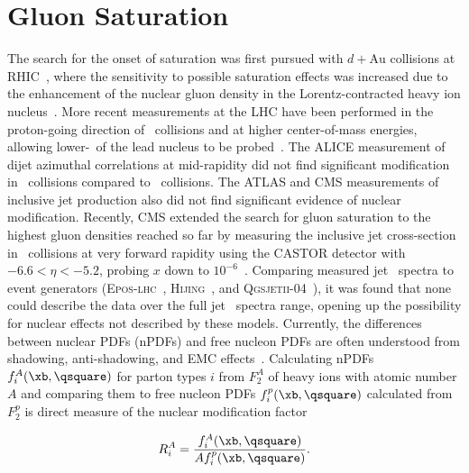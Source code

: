 \FloatBarrier

\section{Gluon Saturation}
The search for the onset of saturation was first pursued with $d+\mathrm{Au}$ collisions at RHIC~\cite{Adler:2003au, Wang:2007zv, Adare:2011sc}, where the sensitivity to possible saturation effects was increased due to the enhancement of the nuclear gluon density in the Lorentz-contracted heavy ion nucleus~\cite{Albacete:2014fwa,Blaizot:2016qgz}. More recent measurements at the LHC have been performed in the proton-going direction of \pPb\ collisions and at higher center-of-mass energies, allowing lower-\xb\ of the lead nucleus to be probed~\cite{ATLAS:2014cpa, Adam:2015xea, Adam:2015hoa, Khachatryan:2016xdg}. The ALICE measurement of dijet azimuthal correlations at mid-rapidity did not find significant modification in \pPb\ collisions compared to \pp\ collisions. The ATLAS and CMS measurements of inclusive jet production also did not find significant evidence of nuclear modification. Recently, CMS extended the search for gluon saturation to the highest gluon densities reached so far by measuring the inclusive jet cross-section in \pPb\ collisions at very forward rapidity using the CASTOR detector with $-6.6 < \eta < -5.2$, probing $x$ down to $10^{-6}$~\cite{VanDeKlundert:2017ulj}. Comparing measured jet \pt\ spectra to event generators (\textsc{Epos-lhc}~\cite{PhysRevC.92.034906}, \textsc{Hijing}~\cite{PhysRevD.44.3501}, and \textsc{Qgsjetii-04}~\cite{qgsjet}), it was found that none could describe the data over the full jet \pt\ spectra range, opening up the possibility for nuclear effects not described by these models. Currently, the differences between nuclear PDFs (nPDFs) and free nucleon PDFs are often understood from shadowing, anti-shadowing, and EMC effects~\cite{Eskola:2016oht,Kovarik:2015cma}. Calculating nPDFs  $f_{i}^{A}( \xb, \qsquare )$ for parton types $i$ from $F_{2}^{A}$ of heavy ions with atomic number $A$ and comparing them to free nucleon PDFs $f_{i}^{p}( \xb, \qsquare )$ calculated from $F_{2}^{p}$ is direct measure of the nuclear modification factor

\begin{equation}
	R^{A}_{i} = \frac{f_{i}^{A}( \xb, \qsquare )}{A f_{i}^{p}( \xb, \qsquare )}.
\end{equation}

